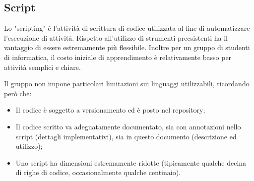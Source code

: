 \subsection{Script}
Lo "scripting" è l'attività di scrittura di codice utilizzata al fine di automatizzare l'esecuzione di attività. Rispetto all'utilizzo di strumenti preesistenti ha il vantaggio di essere estremamente più flessibile. Inoltre per un gruppo di studenti di informatica, il costo iniziale di apprendimento è relativamente basso per attività semplici e chiare.

Il gruppo non impone particolari limitazioni sui linguaggi utilizzabili, ricordando però che:
\begin{itemize}
    \item Il codice è soggetto a versionamento ed è posto nel repository;
    \item Il codice scritto va adeguatamente documentato, sia con annotazioni nello script (dettagli implementativi), sia in questo documento (descrizione ed utilizzo);
    \item Uno script ha dimensioni estremamente ridotte (tipicamente qualche decina di righe di codice, occasionalmente qualche centinaio).
\end{itemize}


